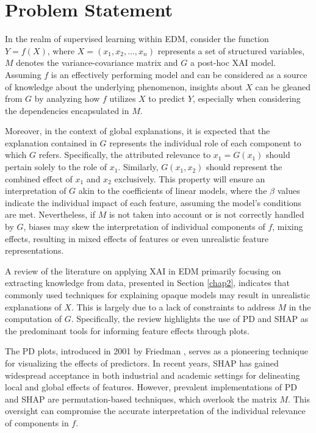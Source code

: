 \section{Problem Statement}

In the realm of supervised learning within \gls{EDM}, consider the function \( Y = f(X) \), where \( X = (x_1, x_2, \ldots, x_n) \) represents a set of structured variables, \( M \) denotes the variance-covariance matrix and \(G\) a post-hoc \gls{XAI} model. Assuming \( f \) is an effectively performing model and can be considered as a source of knowledge about the underlying phenomenon, insights about \( X \) can be gleaned from \(G\) by analyzing how \( f \) utilizes \( X \) to predict \( Y \), especially when considering the dependencies encapsulated in \( M \).

Moreover, in the context of global explanations, it is expected that the explanation contained in \(G\) represents the individual role of each component to which \(G\) refers. Specifically, the attributed relevance to \(x_1 = G(x_1)\) should pertain solely to the role of \(x_1\). Similarly, \(G(x_1, x_2)\) should represent the combined effect of \(x_1\) and \(x_2\) exclusively. This property will ensure an interpretation of \(G\) akin to the coefficients of linear models, where the \(\beta\) values indicate the individual impact of each feature, assuming the model's conditions are met. Nevertheless, if \(M\) is not taken into account or is not correctly handled by \(G\), biases may skew the interpretation of individual components of \(f\), mixing effects, resulting in mixed effects of features or even unrealistic feature representations.

A review of the literature on applying \gls{XAI} in \gls{EDM} primarily focusing on extracting knowledge from data,  presented in Section \ref{chap2}, indicates that commonly used techniques for explaining opaque models may result in unrealistic explanations of \(X\). This is largely due to a lack of constraints to address \(M\) in the computation of \(G\). Specifically, the review highlights the use of \gls{PD} and \gls{SHAP} as the predominant tools for informing feature effects through plots.

The \gls{PD} plots, introduced in 2001 by Friedman \cite{Friedman2001GreedyMachine.}, serves as a pioneering technique for visualizing the effects of predictors. In recent years, \gls{SHAP} \cite{10.5555/3295222.3295230} has gained widespread acceptance in both industrial and academic settings \cite{Bhatt2020ExplainableDeployment} for delineating local and global effects of features. However, prevalent implementations of \gls{PD} and \gls{SHAP} are permutation-based techniques, which overlook the matrix \(M\). This oversight can compromise the accurate interpretation of the individual relevance of components in \(f\). 

